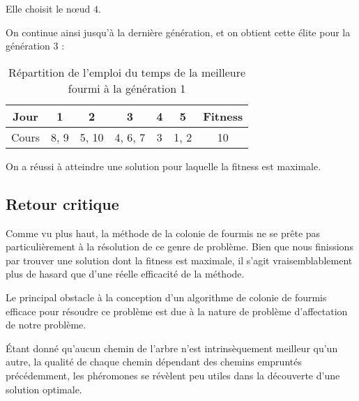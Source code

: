 Elle choisit le n\oe ud $4$.

On continue ainsi jusqu'à la dernière génération, et on obtient cette élite pour la génération 3 :

\begin{table}[!h]
    \centering
    \begin{tabular}{|c|c|c|c|c|c|c|}
        \hline
        Jour  & 1    & 2     & 3       & 4 & 5    & Fitness \\
        \hline
        Cours & 8, 9 & 5, 10 & 4, 6, 7 & 3 & 1, 2 & 10      \\
        \hline
    \end{tabular}
    \caption{Répartition de l'emploi du temps de la meilleure fourmi à la génération 1}\label{tab:fourmi-finale}
\end{table}

On a réussi à atteindre une solution pour laquelle la fitness est maximale.

\subsection{Retour critique}\label{subsec:retour-critique}

Comme vu plus haut, la méthode de la colonie de fourmis ne se prête pas particulièrement à la résolution de ce genre de problème.
Bien que nous finissions par trouver une solution dont la fitness est maximale, il s'agit vraisemblablement plus de hasard que d'une réelle efficacité de la méthode.

Le principal obstacle à la conception d'un algorithme de colonie de fourmis efficace pour résoudre ce problème est due à la nature de problème d'affectation de notre problème.

Étant donné qu'aucun \og chemin \fg{} de l'arbre n'est intrinsèquement meilleur qu'un autre, la qualité de chaque chemin dépendant des chemins empruntés précédemment, les phéromones se révèlent peu utiles dans la découverte d'une solution optimale.